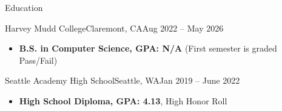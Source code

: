 \documentclass[]{mcdowellcv}
\begin{document}
	\makeheader
	

\begin{cvsection}{Education}
		\begin{cvsubsection}{Harvey Mudd College}{Claremont, CA}{Aug 2022 -- May 2026}
			\begin{itemize}
                    \item \textbf{B.S. in Computer Science, GPA: N/A} (First semester is graded Pass/Fail)
			\end{itemize}
		\end{cvsubsection}
		\begin{cvsubsection}{Seattle Academy High School}{Seattle, WA}{Jan 2019 -- June 2022}
			\begin{itemize}
				\item \textbf{High School Diploma, GPA: 4.13}, High Honor Roll
			\end{itemize}
		\end{cvsubsection}
	\end{cvsection}
\end{document}
